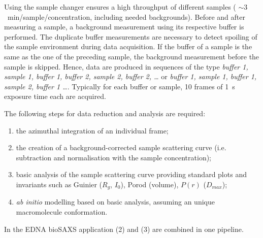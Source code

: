 \documentclass[preprint,pdf]{iucr}              %
\begin{document}
Using the sample changer ensures a high throughput of different samples (
$\sim 3$~min/sample/concentration, including needed backgrounds).
Before and after measuring a sample, a background measurement using its
respective buffer is performed. 
The duplicate buffer measurements are necessary to detect 
spoiling of the sample environment during data acquisition.
If the buffer of a sample is the same as the one of the preceding sample, the
background measurement before the sample is skipped.
Hence, data are produced in sequences of the type \textit{buffer 1, sample 1,
buffer 1, buffer 2, sample 2, buffer 2, \ldots}  or  \textit{buffer 1, sample 1,
buffer 1,  sample 2, buffer 1 \ldots}.
Typically for each buffer or sample, 10 frames of 1~s exposure time each are
acquired.

The following steps for data reduction and analysis are required:
\begin{enumerate}
\item the azimuthal integration of an individual frame;
\item the creation of a background-corrected sample scattering curve (i.e.
subtraction and normalisation with the sample concentration);
\item  basic analysis of the sample scattering curve providing standard plots
and invariants such as Guinier ($R_g$, $I_0$), Porod (volume), $P(r)$
($D_{max}$);
\item \textit{ab initio} modelling based on basic analysis, assuming an unique
macromolecule conformation.
\end{enumerate}
In the EDNA bioSAXS application (2) and (3) are combined in one pipeline.
\end{document}

